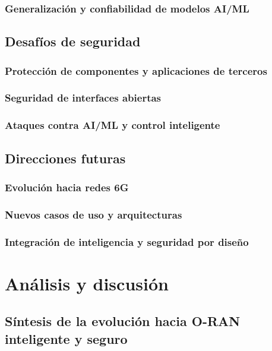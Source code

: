 \documentclass[11pt,a4paper]{article}
\makeatletter
\let\ORIGsection\section
\def\section{\@nobreakfalse\ORIGsection}
\let\ORIGsubsection\subsection
\def\subsection{\@nobreakfalse\ORIGsubsection}
\let\ORIGsubsubsection\subsubsection
\def\subsubsection{\@nobreakfalse\ORIGsubsubsection}
\makeatother
\begin{document}
\subsubsection{Generalización y confiabilidad de modelos AI/ML}

\subsection{Desafíos de seguridad}

\subsubsection{Protección de componentes y aplicaciones de terceros}
\subsubsection{Seguridad de interfaces abiertas}
\subsubsection{Ataques contra AI/ML y control inteligente}

\subsection{Direcciones futuras}

\subsubsection{Evolución hacia redes 6G}
\subsubsection{Nuevos casos de uso y arquitecturas}
\subsubsection{Integración de inteligencia y seguridad por diseño}


\section{Análisis y discusión}

\subsection{Síntesis de la evolución hacia O-RAN inteligente y seguro}
\end{document}

